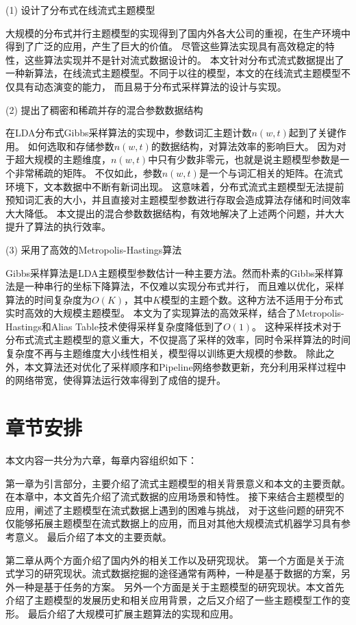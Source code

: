 (1) 设计了分布式在线流式主题模型

大规模的分布式并行主题模型的实现得到了国内外各大公司的重视，在生产环境中得到了广泛的应用，产生了巨大的价值。
尽管这些算法实现具有高效稳定的特性，这些算法实现并不是针对流式数据设计的。
本文针对分布式流式数据提出了一种新算法，在线流式主题模型。不同于以往的模型，本文的在线流式主题模型不仅具有动态演变的能力，
而且易于分布式采样算法的设计与实现。%

(2) 提出了稠密和稀疏并存的混合参数数据结构

在LDA分布式Gibbs采样算法的实现中，参数词汇主题计数$n(w, t)$起到了关键作用。
如何选取和存储参数$n(w, t)$的数据结构，对算法效率的影响巨大。
因为对于超大规模的主题维度，$n(w,t)$中只有少数非零元，也就是说主题模型参数是一个非常稀疏的矩阵。
不仅如此，参数$n(w, t)$是一个与词汇相关的矩阵。在流式环境下，文本数据中不断有新词出现。
这意味着，分布式流式主题模型无法提前预知词汇表的大小，并且直接对主题模型参数进行存取会造成算法存储和时间效率大大降低。
本文提出的混合参数数据结构，有效地解决了上述两个问题，并大大提升了算法的执行效率。

(3) 采用了高效的Metropolis-Hastings算法

Gibbs采样算法是LDA主题模型参数估计一种主要方法。然而朴素的Gibbs采样算法是一种串行的坐标下降算法，不仅难以实现分布式并行，
而且难以优化，采样算法的时间复杂度为$O(K)$，其中$K$模型的主题个数。这种方法不适用于分布式实时高效的大规模主题模型。
本文为了实现算法的高效采样，结合了Metropolis-Hastings和Alias Table技术使得采样复杂度降低到了$O(1)$。
这种采样技术对于分布式流式主题模型的意义重大，不仅提高了采样的效率，同时令采样算法的时间复杂度不再与主题维度大小线性相关，模型得以训练更大规模的参数。
除此之外，本文算法还对优化了采样顺序和Pipeline网络参数更新，充分利用采样过程中的网络带宽，使得算法运行效率得到了成倍的提升。

\section{章节安排}
本文内容一共分为六章，每章内容组织如下：

第一章为引言部分，主要介绍了流式主题模型的相关背景意义和本文的主要贡献。
在本章中，本文首先介绍了流式数据的应用场景和特性。
接下来结合主题模型的应用，阐述了主题模型在流式数据上遇到的困难与挑战，
对于这些问题的研究不仅能够拓展主题模型在流式数据上的应用，而且对其他大规模流式机器学习具有参考意义。
最后介绍了本文的主要贡献。

第二章从两个方面介绍了国内外的相关工作以及研究现状。
第一个方面是关于流式学习的研究现状。流式数据挖掘的途径通常有两种，一种是基于数据的方案，另外一种是基于任务的方案。
另外一个方面是关于主题模型的研究现状。本文首先介绍了主题模型的发展历史和相关应用背景，之后又介绍了一些主题模型工作的变形。
最后介绍了大规模可扩展主题算法的实现和应用。

